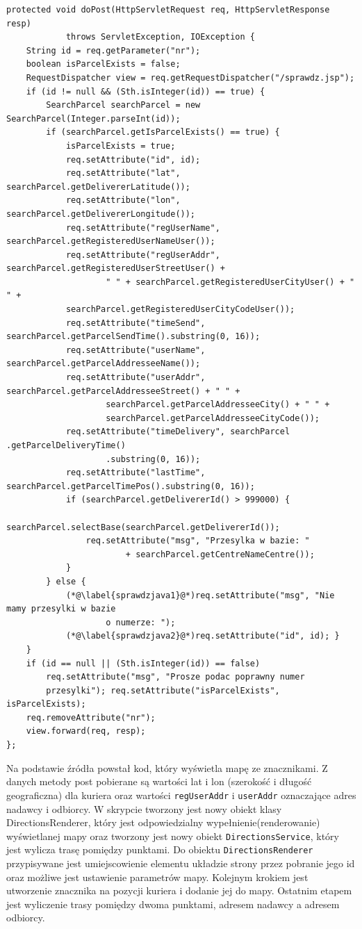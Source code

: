 \documentclass[eng,printmode,oneside]{mgr}
\begin{document}
\begin{lstlisting}[caption=Fragment klasy Sprawdz.Java\,
metoda doPost(),label=sprawdz.java]
protected void doPost(HttpServletRequest req, HttpServletResponse resp)
			throws ServletException, IOException {
	String id = req.getParameter("nr");
	boolean isParcelExists = false;
	RequestDispatcher view = req.getRequestDispatcher("/sprawdz.jsp");
	if (id != null && (Sth.isInteger(id)) == true) {
		SearchParcel searchParcel = new SearchParcel(Integer.parseInt(id));
		if (searchParcel.getIsParcelExists() == true) {
			isParcelExists = true;
			req.setAttribute("id", id);
			req.setAttribute("lat", searchParcel.getDelivererLatitude());
			req.setAttribute("lon", searchParcel.getDelivererLongitude());
			req.setAttribute("regUserName",	searchParcel.getRegisteredUserNameUser());
			req.setAttribute("regUserAddr",	searchParcel.getRegisteredUserStreetUser() +
					" " + searchParcel.getRegisteredUserCityUser() + " " +
			searchParcel.getRegisteredUserCityCodeUser()); 
			req.setAttribute("timeSend", searchParcel.getParcelSendTime().substring(0, 16));
			req.setAttribute("userName", searchParcel.getParcelAddresseeName());
			req.setAttribute("userAddr", searchParcel.getParcelAddresseeStreet() + " " +
					searchParcel.getParcelAddresseeCity() + " "	+ 
					searchParcel.getParcelAddresseeCityCode());
			req.setAttribute("timeDelivery", searchParcel .getParcelDeliveryTime()
					.substring(0, 16)); 
			req.setAttribute("lastTime", searchParcel.getParcelTimePos().substring(0, 16));
			if (searchParcel.getDelivererId() > 999000) {
				searchParcel.selectBase(searchParcel.getDelivererId());
				req.setAttribute("msg", "Przesylka w bazie: "
						+ searchParcel.getCentreNameCentre());
			}
		} else {
			(*@\label{sprawdzjava1}@*)req.setAttribute("msg", "Nie mamy przesylki w bazie
					o numerze: "); 
			(*@\label{sprawdzjava2}@*)req.setAttribute("id", id); }
	}
	if (id == null || (Sth.isInteger(id)) == false)
		req.setAttribute("msg", "Prosze podac poprawny numer
		przesylki"); req.setAttribute("isParcelExists", isParcelExists);
	req.removeAttribute("nr");
	view.forward(req, resp);
};
\end{lstlisting}


Na podstawie źródła \cite{developer.google.maps} powstał kod, który wyświetla
mapę ze znacznikami. Z danych metody post pobierane są wartości lat i lon
(szerokość i długość geograficzna) dla kuriera oraz wartości
\texttt{regUserAddr} i \texttt{userAddr} oznaczające adres nadawcy i odbiorcy. W
skrypcie tworzony jest nowy obiekt klasy DirectionsRenderer, który jest odpowiedzialny
wypełnienie(renderowanie) wyświetlanej mapy oraz tworzony jest nowy obiekt
\texttt{DirectionsService}, który jest wylicza trasę pomiędzy punktami.
Do obiektu \texttt{DirectionsRenderer} przypisywane jest umiejscowienie elementu
układzie strony przez pobranie jego id oraz możliwe jest ustawienie parametrów mapy.
Kolejnym krokiem jest utworzenie znacznika na pozycji kuriera i dodanie jej do
mapy. Ostatnim etapem jest wyliczenie trasy pomiędzy dwoma punktami, adresem
nadawcy a adresem odbiorcy.
\end{document}

